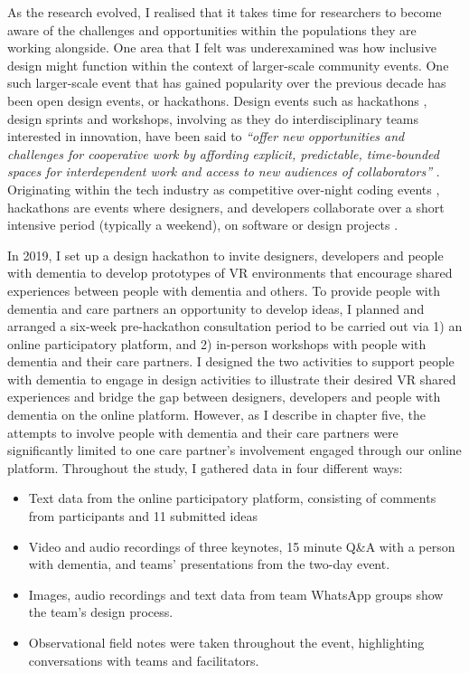 As the research evolved, I realised that it takes time for researchers to become aware of the challenges and opportunities within the populations they are working alongside. One area that I felt was underexamined was how inclusive design might function within the context of larger-scale community events. One such larger-scale event that has gained popularity over the previous decade has been open design events, or hackathons. Design events such as hackathons \citep{olesen_what_2021}, design sprints and workshops, involving as they do interdisciplinary teams interested in innovation, have been said to \textit{``offer new opportunities and challenges for cooperative work by affording explicit, predictable, time-bounded spaces for interdependent work and access to new audiences of collaborators''} \citep{filippova_hacking_2017}. Originating within the tech industry as competitive over-night coding events \citep{jones_theres_2015}, hackathons are events where designers, and developers collaborate over a short intensive period (typically a weekend), on software or design projects \citep{nandi_hackathons_2016}. 

In 2019, I set up a design hackathon to invite designers, developers and people with dementia to develop prototypes of VR environments that encourage shared experiences between people with dementia and others. To provide people with dementia and care partners an opportunity to develop ideas, I planned and arranged a six-week pre-hackathon consultation period to be carried out via 1) an online participatory platform, and 2) in-person workshops with people with dementia and their care partners. I designed the two activities to support people with dementia to engage in design activities to illustrate their desired VR shared experiences and bridge the gap between designers, developers and people with dementia on the online platform. However, as I describe in chapter five, the attempts to involve people with dementia and their care partners were significantly limited to one care partner's involvement engaged through our online platform. Throughout the study, I gathered data in four different ways:
\begin{itemize}
    \item Text data from the online participatory platform, consisting of comments from participants and 11 submitted ideas
    \item Video and audio recordings of three keynotes, 15 minute Q\&A with a person with dementia, and teams' presentations from the two-day event.
    \item Images, audio recordings and text data from team WhatsApp groups show the team's design process.
    \item Observational field notes were taken throughout the event, highlighting conversations with teams and facilitators.
\end{itemize}

